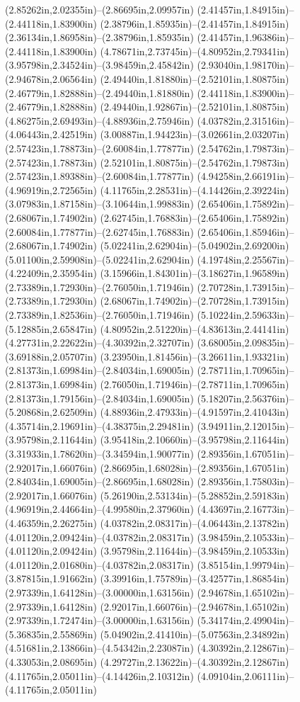 (2.85262in,2.02355in)--(2.86695in,2.09957in) (2.41457in,1.84915in)--(2.44118in,1.83900in) (2.38796in,1.85935in)--(2.41457in,1.84915in) (2.36134in,1.86958in)--(2.38796in,1.85935in) (2.41457in,1.96386in)--(2.44118in,1.83900in) (4.78671in,2.73745in)--(4.80952in,2.79341in) (3.95798in,2.34524in)--(3.98459in,2.45842in) (2.93040in,1.98170in)--(2.94678in,2.06564in) (2.49440in,1.81880in)--(2.52101in,1.80875in) (2.46779in,1.82888in)--(2.49440in,1.81880in) (2.44118in,1.83900in)--(2.46779in,1.82888in) (2.49440in,1.92867in)--(2.52101in,1.80875in) (4.86275in,2.69493in)--(4.88936in,2.75946in) (4.03782in,2.31516in)--(4.06443in,2.42519in) (3.00887in,1.94423in)--(3.02661in,2.03207in) (2.57423in,1.78873in)--(2.60084in,1.77877in) (2.54762in,1.79873in)--(2.57423in,1.78873in) (2.52101in,1.80875in)--(2.54762in,1.79873in) (2.57423in,1.89388in)--(2.60084in,1.77877in) (4.94258in,2.66191in)--(4.96919in,2.72565in) (4.11765in,2.28531in)--(4.14426in,2.39224in) (3.07983in,1.87158in)--(3.10644in,1.99883in) (2.65406in,1.75892in)--(2.68067in,1.74902in) (2.62745in,1.76883in)--(2.65406in,1.75892in) (2.60084in,1.77877in)--(2.62745in,1.76883in) (2.65406in,1.85946in)--(2.68067in,1.74902in) (5.02241in,2.62904in)--(5.04902in,2.69200in) (5.01100in,2.59908in)--(5.02241in,2.62904in) (4.19748in,2.25567in)--(4.22409in,2.35954in) (3.15966in,1.84301in)--(3.18627in,1.96589in) (2.73389in,1.72930in)--(2.76050in,1.71946in) (2.70728in,1.73915in)--(2.73389in,1.72930in) (2.68067in,1.74902in)--(2.70728in,1.73915in) (2.73389in,1.82536in)--(2.76050in,1.71946in) (5.10224in,2.59633in)--(5.12885in,2.65847in) (4.80952in,2.51220in)--(4.83613in,2.44141in) (4.27731in,2.22622in)--(4.30392in,2.32707in) (3.68005in,2.09835in)--(3.69188in,2.05707in) (3.23950in,1.81456in)--(3.26611in,1.93321in) (2.81373in,1.69984in)--(2.84034in,1.69005in) (2.78711in,1.70965in)--(2.81373in,1.69984in) (2.76050in,1.71946in)--(2.78711in,1.70965in) (2.81373in,1.79156in)--(2.84034in,1.69005in) (5.18207in,2.56376in)--(5.20868in,2.62509in) (4.88936in,2.47933in)--(4.91597in,2.41043in) (4.35714in,2.19691in)--(4.38375in,2.29481in) (3.94911in,2.12015in)--(3.95798in,2.11644in) (3.95418in,2.10660in)--(3.95798in,2.11644in) (3.31933in,1.78620in)--(3.34594in,1.90077in) (2.89356in,1.67051in)--(2.92017in,1.66076in) (2.86695in,1.68028in)--(2.89356in,1.67051in) (2.84034in,1.69005in)--(2.86695in,1.68028in) (2.89356in,1.75803in)--(2.92017in,1.66076in) (5.26190in,2.53134in)--(5.28852in,2.59183in) (4.96919in,2.44664in)--(4.99580in,2.37960in) (4.43697in,2.16773in)--(4.46359in,2.26275in) (4.03782in,2.08317in)--(4.06443in,2.13782in) (4.01120in,2.09424in)--(4.03782in,2.08317in) (3.98459in,2.10533in)--(4.01120in,2.09424in) (3.95798in,2.11644in)--(3.98459in,2.10533in) (4.01120in,2.01680in)--(4.03782in,2.08317in) (3.85154in,1.99794in)--(3.87815in,1.91662in) (3.39916in,1.75789in)--(3.42577in,1.86854in) (2.97339in,1.64128in)--(3.00000in,1.63156in) (2.94678in,1.65102in)--(2.97339in,1.64128in) (2.92017in,1.66076in)--(2.94678in,1.65102in) (2.97339in,1.72474in)--(3.00000in,1.63156in) (5.34174in,2.49904in)--(5.36835in,2.55869in) (5.04902in,2.41410in)--(5.07563in,2.34892in) (4.51681in,2.13866in)--(4.54342in,2.23087in) (4.30392in,2.12867in)--(4.33053in,2.08695in) (4.29727in,2.13622in)--(4.30392in,2.12867in) (4.11765in,2.05011in)--(4.14426in,2.10312in) (4.09104in,2.06111in)--(4.11765in,2.05011in) 